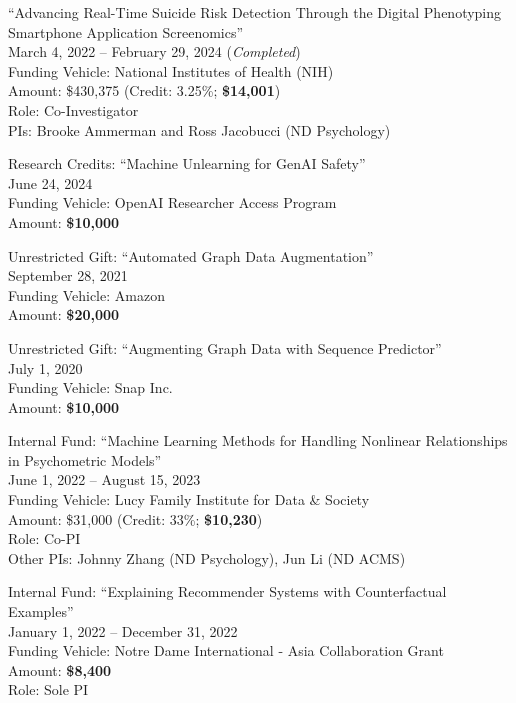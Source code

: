 \documentclass[10pt]{article}
\newenvironment{myindentpar}[1]%
{\begin{list}{}%
         {\setlength{\leftmargin}{#1}}%
         \item[]%
}
{\end{list}}
\newcounter{list}
\begin{document}
\begin{myindentpar}{0.75cm}
\hspace{-0.75cm}``Advancing Real-Time Suicide Risk Detection Through the Digital Phenotyping Smartphone Application Screenomics'' \\
March 4, 2022 -- February 29, 2024 (\emph{Completed}) \\
Funding Vehicle: National Institutes of Health  (NIH) \\
Amount: \$430,375 (Credit: 3.25\%; \textbf{\$14,001}) \\
Role: {Co-Investigator} \\
PIs: Brooke Ammerman and Ross Jacobucci (ND Psychology)

\hspace{-0.75cm}Research Credits: ``Machine Unlearning for GenAI Safety''\\
June 24, 2024 \\
Funding Vehicle: OpenAI Researcher Access Program \\
Amount: \textbf{\$10,000}

\hspace{-0.75cm}Unrestricted Gift: ``Automated Graph Data Augmentation''\\
September 28, 2021 \\
Funding Vehicle: Amazon \\
Amount: \textbf{\$20,000}

\hspace{-0.75cm}Unrestricted Gift: ``Augmenting Graph Data with Sequence Predictor'' \\
July 1, 2020 \\
Funding Vehicle: Snap Inc. \\
Amount: \textbf{\$10,000}

\hspace{-0.75cm}Internal Fund: ``Machine Learning Methods for Handling Nonlinear Relationships in Psychometric Models'' \\
June 1, 2022 -- August 15, 2023 \\
Funding Vehicle: Lucy Family Institute for Data \& Society \\
Amount: \$31,000 (Credit: 33\%; \textbf{\$10,230}) \\
Role: {Co-PI} \\
Other PIs: Johnny Zhang (ND Psychology), Jun Li (ND ACMS)

\hspace{-0.75cm}Internal Fund: ``Explaining Recommender Systems with Counterfactual Examples''\\
January 1, 2022 -- December 31, 2022 \\
Funding Vehicle: Notre Dame International - Asia Collaboration Grant \\
Amount: \textbf{\$8,400} \\
Role: {Sole PI}


\end{myindentpar}
\end{document}
